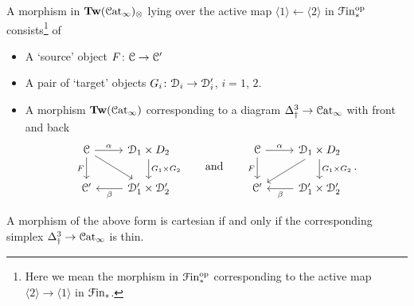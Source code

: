 \documentclass[main.tex]{subfiles}
\begin{document}
\begin{example}
  A morphism in $\mathbf{Tw}(\mathcal{C}\mathrm{at}_{\infty})_{\otimes}$ lying over the active map $\langle 1 \rangle \leftarrow \langle 2 \rangle$ in $\mathcal{F}\mathrm{in}_{*}^{\mathrm{op}}$ consists\footnote{Here we mean the morphism in $\mathcal{F}\mathrm{in}_{*}^{\mathrm{op}}$ corresponding to the active map $\langle 2 \rangle \to \langle 1 \rangle$ in $\mathcal{F}\mathrm{in}_{*}$.} of
  \begin{itemize}
    \item A `source' object $F\colon \mathcal{C} \to \mathcal{C}'$

    \item A pair of `target' objects $G_{i}\colon \mathcal{D}_{i} \to \mathcal{D}'_{i}$, $i = 1$, $2$.

    \item A morphism $\mathbf{Tw}(\mathcal{C}\mathrm{at}_{\infty})$ corresponding to a diagram $\Delta^{3}_{\dagger} \to \mathcal{C}\mathrm{at}_{\infty}$ with front and back
      \begin{equation*}
        \begin{tikzcd}
          \category{C}
          \arrow[r, "\alpha"]
          \arrow[d, ""{name=L, right}, "F"{left}]
          \arrow[dr]
          & \category{D}_{1} \times D_{2}
          \arrow[d, ""{name=R, left}, "G_{1} \times G_{2}"{right}]
          \\
          \category{C}'
          & \category{D}'_{1} \times \category{D}'_{2}
          \arrow[l, "\beta"]
        \end{tikzcd}
        \qquad\text{and}\qquad
        \begin{tikzcd}
          \category{C}
          \arrow[r, "\alpha"]
          \arrow[d, ""{name=L, right}, "F"{left}]
          & \category{D}_{1} \times D_{2}
          \arrow[d, ""{name=R, left}, "G_{1} \times G_{2}"{right}]
          \arrow[dl]
          \\
          \category{C}'
          & \category{D}'_{1} \times \category{D}'_{2}
          \arrow[l, "\beta"]
        \end{tikzcd}.
      \end{equation*}
  \end{itemize}

  A morphism of the above form is cartesian if and only if the corresponding simplex $\Delta^{3}_{\dagger} \to \mathcal{C}\mathrm{at}_{\infty}$ is thin.
\end{example}
\end{document}

